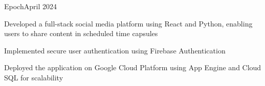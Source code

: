 \begin{resume_subsection}{Epoch}{April 2024}
    \begin{subitems}
        \item Developed a full-stack social media platform using React and Python, enabling users to share content in scheduled time capsules
        \item Implemented secure user authentication using Firebase Authentication
        \item Deployed the application on Google Cloud Platform using App Engine and Cloud SQL for scalability
    \end{subitems}
\end{resume_subsection}

